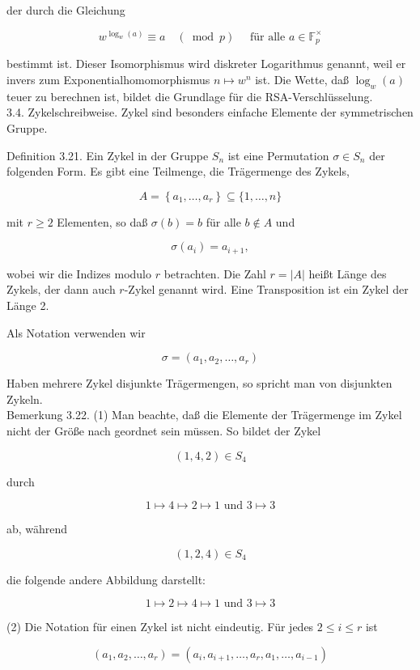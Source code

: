 \documentclass[10pt, letterpaper]{article}
\begin{document}
der durch die Gleichung

$$
w^{\log _{w}(a)} \equiv a \quad(\bmod p) \quad \text { für alle } a \in \mathbb{F}_{p}^{\times}
$$

bestimmt ist. Dieser Isomorphismus wird diskreter Logarithmus genannt, weil er invers zum Exponentialhomomorphismus $n \mapsto w^{n}$ ist. Die Wette, daß $\log _{w}(a)$ teuer zu berechnen ist, bildet die Grundlage für die RSA-Verschlüsselung.\\
3.4. Zykelschreibweise. Zykel sind besonders einfache Elemente der symmetrischen Gruppe.

Definition 3.21. Ein Zykel in der Gruppe $S_{n}$ ist eine Permutation $\sigma \in S_{n}$ der folgenden Form. Es gibt eine Teilmenge, die Trägermenge des Zykels,

$$
A=\left\{a_{1}, \ldots, a_{r}\right\} \subseteq\{1, \ldots, n\}
$$

mit $r \geq 2$ Elementen, so daß $\sigma(b)=b$ für alle $b \notin A$ und

$$
\sigma\left(a_{i}\right)=a_{i+1},
$$

wobei wir die Indizes modulo $r$ betrachten. Die Zahl $r=|A|$ heißt Länge des Zykels, der dann auch $r$-Zykel genannt wird. Eine Transposition ist ein Zykel der Länge 2.

Als Notation verwenden wir

$$
\sigma=\left(a_{1}, a_{2}, \ldots, a_{r}\right)
$$

Haben mehrere Zykel disjunkte Trägermengen, so spricht man von disjunkten Zykeln.\\
Bemerkung 3.22. (1) Man beachte, daß die Elemente der Trägermenge im Zykel nicht der Größe nach geordnet sein müssen. So bildet der Zykel

$$
(1,4,2) \in S_{4}
$$

durch

$$
1 \mapsto 4 \mapsto 2 \mapsto 1 \text { und } 3 \mapsto 3
$$

ab, während

$$
(1,2,4) \in S_{4}
$$

die folgende andere Abbildung darstellt:

$$
1 \mapsto 2 \mapsto 4 \mapsto 1 \text { und } 3 \mapsto 3
$$

(2) Die Notation für einen Zykel ist nicht eindeutig. Für jedes $2 \leq i \leq r$ ist

$$
\left(a_{1}, a_{2}, \ldots, a_{r}\right)=\left(a_{i}, a_{i+1}, \ldots, a_{r}, a_{1}, \ldots, a_{i-1}\right)
$$
\end{document}
